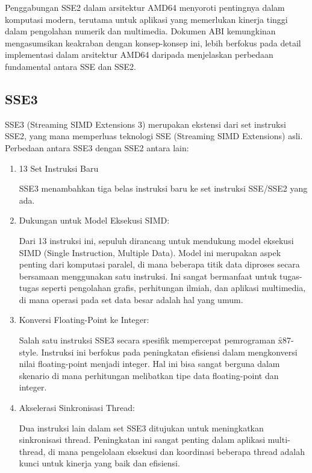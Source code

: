 Penggabungan SSE2 dalam arsitektur AMD64 menyoroti pentingnya dalam komputasi modern, terutama untuk aplikasi yang memerlukan kinerja tinggi dalam pengolahan numerik dan multimedia. Dokumen ABI kemungkinan mengasumsikan keakraban dengan konsep-konsep ini, lebih berfokus pada detail implementasi dalam arsitektur AMD64 daripada menjelaskan perbedaan fundamental antara SSE dan SSE2\cite{SystemVAppBinaryInterfaceMichael}.

\subsection{SSE3}
SSE3 (Streaming SIMD Extensions 3) merupakan ekstensi dari set instruksi SSE2, yang mana memperluas teknologi SSE (Streaming SIMD Extensions) asli. Perbedaan antara SSE3 dengan SSE2 antara lain:

\begin{enumerate}
	\item 13 Set Instruksi Baru
	
	SSE3 menambahkan tiga belas instruksi baru ke set instruksi SSE/SSE2 yang ada\cite{Hassaballah2008}.
	
	\item Dukungan untuk Model Eksekusi SIMD:
	
	Dari 13 instruksi ini, sepuluh dirancang untuk mendukung model eksekusi SIMD (Single Instruction, Multiple Data). Model ini merupakan aspek penting dari komputasi paralel, di mana beberapa titik data diproses secara bersamaan menggunakan satu instruksi. Ini sangat bermanfaat untuk tugas-tugas seperti pengolahan grafis, perhitungan ilmiah, dan aplikasi multimedia, di mana operasi pada set data besar adalah hal yang umum\cite{Hassaballah2008}.
	 
	\item Konversi Floating-Point ke Integer:
	
	Salah satu instruksi SSE3 secara spesifik mempercepat pemrograman \f{x87-style}. Instruksi ini berfokus pada peningkatan efisiensi dalam mengkonversi nilai floating-point menjadi integer. Hal ini bisa sangat berguna dalam skenario di mana perhitungan melibatkan tipe data floating-point dan integer\cite{Hassaballah2008}.
	 
	\item Akselerasi Sinkronisasi Thread:
	 
	Dua instruksi lain dalam set SSE3 ditujukan untuk meningkatkan sinkronisasi thread. Peningkatan ini sangat penting dalam aplikasi multi-thread, di mana pengelolaan eksekusi dan koordinasi beberapa thread adalah kunci untuk kinerja yang baik dan efisiensi\cite{Hassaballah2008}.
\end{enumerate}

